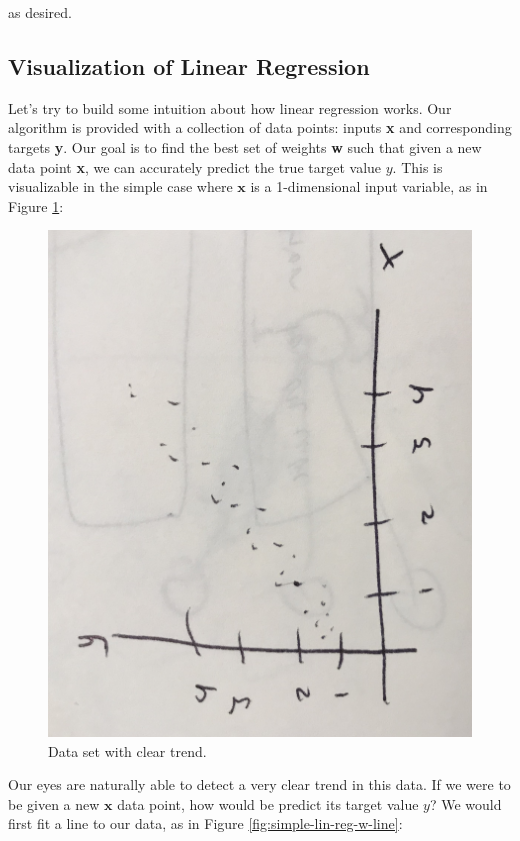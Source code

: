 as desired.

\subsection{Visualization of Linear Regression}
Let's try to build some intuition about how linear regression works. Our algorithm is provided with a collection of data points: inputs \textbf{x} and corresponding targets \textbf{y}. Our goal is to find the best set of weights \textbf{w} such that given a new data point \textbf{x}, we can accurately predict the true target value $y$. This is visualizable in the simple case where $\textbf{x}$ is a 1-dimensional input variable, as in Figure \ref{fig:simple-lin-reg}:

\begin{figure}[H]
    \centering
    \includegraphics[width=0.5\paperwidth,angle=270]{../LinearRegression/fig/simple_lin_reg.jpg}
    \caption{Data set with clear trend.}
    \label{fig:simple-lin-reg}
\end{figure}

Our eyes are naturally able to detect a very clear trend in this data. If we were to be given a new $\textbf{x}$ data point, how would be predict its target value $y$? We would first fit a line to our data, as in Figure \ref{fig:simple-lin-reg-w-line}:

